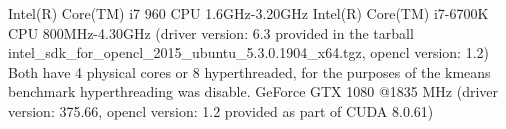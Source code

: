 \documentclass[../document.tex]{subfiles}
\begin{document}
\label{ssec:hardware}

Intel(R) Core(TM) i7 960 CPU 1.6GHz-3.20GHz
Intel(R) Core(TM) i7-6700K CPU 800MHz-4.30GHz (driver version: 6.3 provided in the tarball intel\_sdk\_for\_opencl\_2015\_ubuntu\_5.3.0.1904\_x64.tgz, opencl version: 1.2)
Both have 4 physical cores or 8 hyperthreaded, for the purposes of the kmeans benchmark hyperthreading was disable.
GeForce GTX 1080 @1835 MHz (driver version: 375.66, opencl version: 1.2 provided as part of CUDA 8.0.61)
\end{document}
